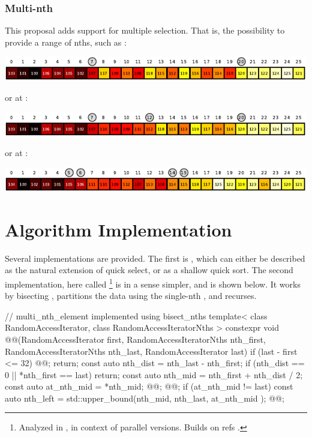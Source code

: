 \subsubsection*{Multi-nth }

This proposal adds support for multiple selection. That is, the possibility to provide a range of nths, such as  :

\includegraphics[width=0.999\textwidth]{plotting/figs/2.pdf}

or at :

\includegraphics[width=0.999\textwidth]{plotting/figs/3.pdf}

or  at :

\includegraphics[width=0.999\textwidth]{plotting/figs/qs.pdf}

\newpage
\section{Algorithm Implementation}
\label{Implementation}
\label{Implement}

Several implementations are provided\cite{p2375RefImpl}. The first is , which can either be described as the natural extension of quick select, or as a shallow quick sort. The second implementation, here called \footnote{Analyzed in \cite{Alsuwaiyel2001}, in context of 
parallel versions. Builds on refs \cite{Akl1984,Akl1989,Shen1997}.} 
 is in a sense simpler, and is shown below. It works by bisecting , partitions the data using the single-nth , and recurses. 

\begin{codeblock}
// multi_nth_element implemented using bisect_nths
template< class RandomAccessIterator, class RandomAccessIteratorNths >
constexpr void @@(RandomAccessIterator first, 
  RandomAccessIteratorNths nth_first, RandomAccessIteratorNths nth_last, 
  RandomAccessIterator last){
  if (last - first <= 32) { @@; return; }
  const auto nth_dist = nth_last - nth_first;
  if (nth_dist == 0 || *nth_first == last) return;
  const auto nth_mid = nth_first + nth_dist / 2;
  const auto at_nth_mid = *nth_mid;
  @@;
  @@;
  if (at_nth_mid != last){
    const auto nth_left = std::upper_bound(nth_mid, nth_last, at_nth_mid );
    @@;
  }
}
\end{codeblock}


